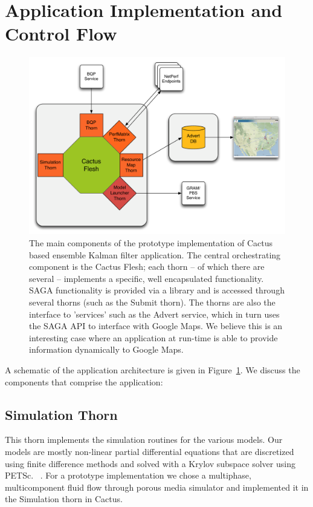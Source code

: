 \documentclass[conference,final]{IEEEtran}
\begin{document}
\section{Application Implementation and Control Flow} 

\begin{figure}
\begin{center}
\includegraphics[scale=0.34]{./figures/ApplicationArchitecture}
\end{center}
\caption{The main components of the prototype implementation of Cactus
  based ensemble Kalman filter application. The central orchestrating
  component is the Cactus Flesh; each thorn -- of which there are
  several -- implements a specific, well encapsulated functionality.
  SAGA functionality is provided via a library and is accessed through
  several thorns (such as the Submit thorn).  The thorns are also the
  interface to 'services' such as the Advert service, which in turn
  uses the SAGA API to interface with Google Maps. We believe this is
  an interesting case where an application at run-time is able to
  provide information dynamically to Google Maps.}
\label{fig:application_architecture}
\end{figure}

A schematic of the application architecture is given in
Figure~\ref{fig:application_architecture}. We discuss the components
that comprise the application:

\subsection{Simulation Thorn}

This thorn implements the simulation routines for the various models.
Our models are mostly non-linear partial differential equations that
are discretized using finite difference methods and solved with a
Krylov subspace solver using PETSc. ~\cite{PETSc}. For a prototype
implementation we chose a multiphase, multicomponent fluid flow
through porous media simulator and implemented it in the Simulation
thorn in Cactus.
\end{document}
